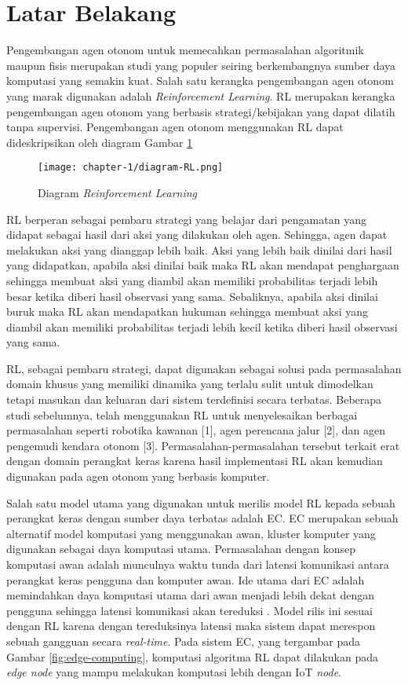 \section{Latar Belakang}

Pengembangan agen otonom untuk memecahkan permasalahan algoritmik maupun fisis merupakan studi yang populer seiring berkembangnya sumber daya komputasi yang semakin kuat. Salah satu kerangka pengembangan agen otonom yang marak digunakan adalah \textit{Reinforcement Learning}. \ac{RL} merupakan kerangka pengembangan agen otonom yang berbasis strategi/kebijakan yang dapat dilatih tanpa supervisi. Pengembangan agen otonom menggunakan \ac{RL} dapat dideskripsikan oleh diagram Gambar \ref{fig:RL-diagram}

\begin{figure}[h]
	\centering
	\texttt{[image: chapter-1/diagram-RL.png]}
	\caption{Diagram \textit{Reinforcement Learning}}
	\label{fig:RL-diagram}
\end{figure}

\ac{RL} berperan sebagai pembaru strategi yang belajar dari pengamatan yang didapat sebagai hasil dari aksi yang dilakukan oleh agen. Sehingga, agen dapat melakukan aksi yang dianggap lebih baik. Aksi yang lebih baik dinilai dari hasil yang didapatkan, apabila aksi dinilai baik maka \ac{RL} akan mendapat penghargaan sehingga membuat aksi yang diambil akan memiliki probabilitas terjadi lebih besar ketika diberi hasil observasi yang sama. Sebaliknya, apabila aksi dinilai buruk maka \ac{RL} akan mendapatkan hukuman sehingga membuat aksi yang diambil akan memiliki probabilitas terjadi lebih kecil ketika diberi hasil observasi yang sama.

\ac{RL}, sebagai pembaru strategi, dapat digunakan sebagai solusi pada permasalahan domain khusus yang memiliki dinamika yang terlalu sulit untuk dimodelkan tetapi masukan dan keluaran dari sistem terdefinisi secara terbatas. Beberapa studi sebelumnya, telah menggunakan RL untuk menyelesaikan berbagai permasalahan seperti robotika kawanan [1], agen perencana jalur [2], dan agen pengemudi kendara otonom [3]. Permasalahan-permasalahan tersebut terkait erat dengan domain perangkat keras karena hasil implementasi RL akan kemudian digunakan pada agen otonom yang berbasis komputer.

Salah satu model utama yang digunakan untuk merilis model RL kepada sebuah perangkat keras dengan sumber daya terbatas adalah \ac{EC}. \ac{EC} merupakan sebuah alternatif model komputasi yang menggunakan awan, kluster komputer yang digunakan sebagai daya komputasi utama. Permasalahan dengan konsep komputasi awan adalah munculnya waktu tunda dari latensi komunikasi antara perangkat keras pengguna dan komputer awan. Ide utama dari \ac{EC} adalah memindahkan daya komputasi utama dari awan menjadi lebih dekat dengan pengguna sehingga latensi komunikasi akan tereduksi \parencite{edgecomputing}. Model rilis ini sesuai dengan RL karena dengan tereduksinya latensi maka sistem dapat merespon sebuah gangguan secara \textit{real-time}. Pada sistem \ac{EC}, yang tergambar pada Gambar \ref{fig:edge-computing}, komputasi algoritma RL dapat dilakukan pada \textit{edge node} yang mampu melakukan komputasi lebih dengan \ac{IoT} \textit{node}.

